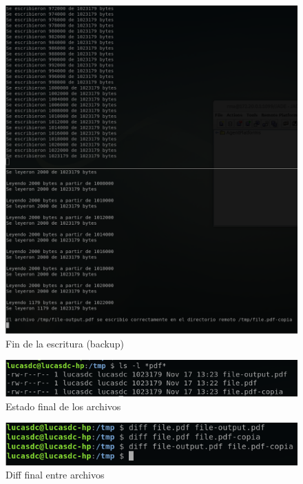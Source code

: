\documentclass[12pt,journal,compsoc]{IEEEtran}
\begin{document}
\begin{figure}[H]
  \centering
  \includegraphics[width=160mm]{images/punto-3/readwrite/5-end-write.png}
  \caption{Fin de la escritura (backup)}
  \label{fig:end-write-backup}
\end{figure}

\begin{figure}[H]
  \centering
  \includegraphics[width=160mm]{images/punto-3/readwrite/6-end-state.png}
  \caption{Estado final de los archivos}
  \label{fig:end-state}
\end{figure}

\begin{figure}[H]
  \centering
  \includegraphics[width=160mm]{images/punto-3/readwrite/7-diff.png}
  \caption{Diff final entre archivos}
  \label{fig:diff}
\end{figure}
\end{document}
